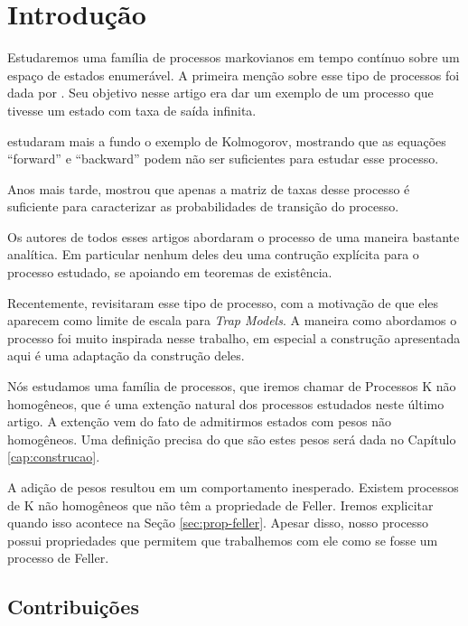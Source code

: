 \chapter{Introdução}
\label{cap:introducao}

Estudaremos uma família de processos markovianos em tempo contínuo sobre
um espaço de estados enumerável. A primeira menção sobre esse tipo de
processos foi dada por \cite{kolmogorov:51}. Seu objetivo nesse artigo
era dar um exemplo de um processo que tivesse um estado com taxa de
saída infinita.

\cite{kendall:56} estudaram mais a fundo o exemplo de Kolmogorov,
mostrando que as equações ``forward'' e ``backward'' podem não ser
suficientes para estudar esse processo.

Anos mais tarde, \cite{reuter:69} mostrou que apenas a matriz de taxas
desse processo é suficiente para caracterizar as probabilidades de
transição do processo.

Os autores de todos esses artigos abordaram o processo de uma maneira
bastante analítica. Em particular nenhum deles deu uma contrução
explícita para o processo estudado, se apoiando em teoremas de
existência.

Recentemente, \cite{fontes:08} revisitaram esse tipo de processo,
com a motivação de que eles aparecem como limite de escala para
\emph{Trap Models}. A maneira como abordamos o processo foi muito
inspirada nesse trabalho, em especial a construção apresentada aqui é
uma adaptação da construção deles.

Nós estudamos uma família de processos, que iremos chamar de Processos
K não homogêneos, que é uma extenção natural dos processos estudados
neste último artigo. A extenção vem do fato de admitirmos estados com
pesos não homogêneos. Uma definição precisa do que são estes pesos
será dada no Capítulo \ref{cap:construcao}.

A adição de pesos resultou em um comportamento inesperado. Existem
processos de K não homogêneos que não têm a propriedade de Feller.
Iremos explicitar quando isso acontece na Seção \ref{sec:prop-feller}.
Apesar disso, nosso processo possui propriedades que permitem que
trabalhemos com ele como se fosse um processo de Feller.

\section{Contribuições}
\label{sec:contribucoes}

